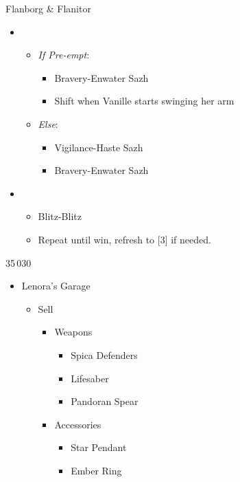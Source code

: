 \begin{paracol}{2}
\begin{battle}{Flanborg \& Flanitor}
\begin{itemize}
			\item \first
			      \begin{itemize}
				      \item \textit{If Pre-empt}:
				            \begin{itemize}
					            \item Bravery-Enwater Sazh
					            \item Shift when Vanille starts swinging her arm
				            \end{itemize}
				      \item \textit{Else}:
				            \begin{itemize}
					            \item Vigilance-Haste Sazh
					            \item Bravery-Enwater Sazh
				            \end{itemize}
			      \end{itemize}
			\item \sixth
			      \begin{itemize}
				      \item Blitz-Blitz
				      \item Repeat until win, refresh to [3] if needed.
			      \end{itemize}
		\end{itemize}
		 
	\end{battle}
	\begin{shop}{35\,030}
		\begin{itemize}
			\item Lenora's Garage
			      \begin{itemize}
				      \item Sell
				            \begin{itemize}
					            \item Weapons
					                  \begin{itemize}
						                  \item Spica Defenders
						                  \item Lifesaber
						                  \item Pandoran Spear
					                  \end{itemize}
					            \item Accessories
					                  \begin{itemize}
						                  \item Star Pendant
						                  \item Ember Ring

\end{itemize}
\end{itemize}
\end{itemize}
\end{itemize}
\end{shop}
\end{paracol}
